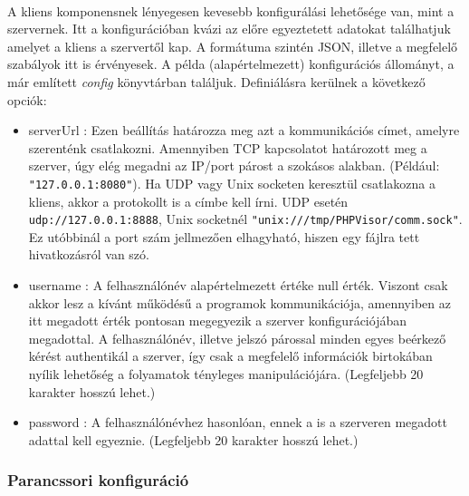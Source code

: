 \documentclass[12pt]{report}
\begin{document}
\paragraph{}
A kliens komponensnek lényegesen kevesebb konfigurálási lehetősége van, mint a szervernek. Itt a konfigurációban kvázi az előre egyeztetett adatokat találhatjuk amelyet a kliens a szervertől kap. A formátuma szintén JSON, illetve a megfelelő szabályok itt is érvényesek. A példa (alapértelmezett) konfigurációs állományt, a már említett \textit{config} könyvtárban találjuk. Definiálásra kerülnek a következő opciók:
\begin{itemize}
\item serverUrl : Ezen beállítás határozza meg azt a kommunikációs címet, amelyre szerenténk csatlakozni. Amennyiben TCP kapcsolatot határozott meg a szerver, úgy elég megadni az IP/port párost a szokásos alakban. (Például: \verb|"127.0.0.1:8080"|). Ha UDP vagy Unix socketen keresztül csatlakozna a kliens, akkor a protokollt is a címbe kell írni. UDP esetén \verb|udp://127.0.0.1:8888|, Unix socketnél \verb|"unix:///tmp/PHPVisor/comm.sock"|. Ez utóbbinál a port szám jellmezően elhagyható, hiszen egy fájlra tett hivatkozásról van szó.
\item username : A felhasználónév alapértelmezett értéke null érték. Viszont csak akkor lesz  a kívánt működésű  a programok kommunikációja, amennyiben az itt megadott érték pontosan megegyezik a szerver konfigurációjában megadottal. A felhasználónév, illetve jelszó párossal minden egyes beérkező kérést authentikál a szerver, így csak a megfelelő információk birtokában nyílik lehetőség a folyamatok tényleges manipulációjára. (Legfeljebb 20 karakter hosszú lehet.)
\item password : A felhasználónévhez hasonlóan, ennek a is a szerveren megadott adattal kell egyeznie. (Legfeljebb 20 karakter hosszú lehet.) 
\end{itemize}

\subsubsection{Parancssori konfiguráció}
\end{document}
